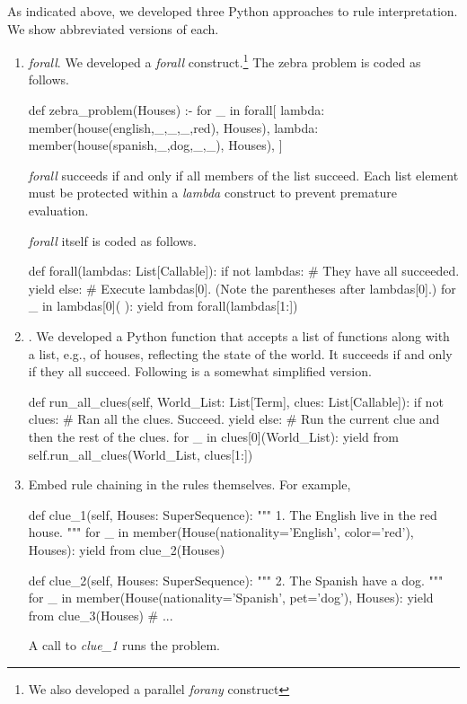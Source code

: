 As indicated above, we developed three Python approaches to rule interpretation. We show abbreviated versions of each.
\begin{enumerate}

\item \textit{forall}. We developed a \textit{forall} construct.\footnote{We also developed a parallel \textit{forany} construct} The zebra problem is coded as follows.

\begin{python}
def zebra_problem(Houses) :-
    for _ in forall{[
        lambda: member(house(english,_,_,_,red), Houses),
        lambda: member(house(spanish,_,dog,_,_), Houses),
        ]}
\end{python}

 \textit{forall} succeeds if and only if all members of the list succeed. Each list element must be protected within a \textit{lambda} construct to prevent premature evaluation.
 \smallv
 
 \textit{forall} itself is coded as follows.
 
\begin{python}
def forall(lambdas: List[Callable]):
  if not lambdas:
    # They have all succeeded.
    yield
  else:
    # Execute lambdas[0]. (Note the parentheses after lambdas[0].)
    for _ in lambdas[0]( ):
      yield from forall(lambdas[1:])
 
 \end{python}

\item {}. We developed a Python function that accepts a list of functions along with a list, e.g., of houses, reflecting the state of the world. It succeeds if and only if they all succeed. Following is a somewhat simplified version.

\begin{python}
def run_all_clues(self, World_List: List[Term], clues: List[Callable]):
    if not clues:
      # Ran all the clues. Succeed.
      yield
    else:
      # Run the current clue and then the rest of the clues.
      for _ in clues[0](World_List):
        yield from self.run_all_clues(World_List, clues[1:])
\end{python}

\item Embed rule chaining in the rules themselves. For example,

\begin{python}
  def clue_1(self, Houses: SuperSequence):
    """ 1. The English live in the red house.  """
    for _ in member(House(nationality='English', color='red'), Houses):
      yield from clue_2(Houses)

  def clue_2(self, Houses: SuperSequence):
    """ 2. The Spanish have a dog. """
    for _ in member(House(nationality='Spanish', pet='dog'), Houses):
      yield from clue_3(Houses)
  # ...
\end{python}

A call to \textit{clue\_1} runs the problem.
\end{enumerate}

